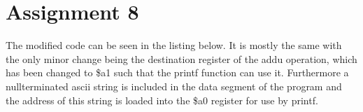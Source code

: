 \section{Assignment 8 }
The modified code can be seen in the listing below. It is mostly the same with the only minor change being the
destination register of the addu operation, which has been changed to \$a1 such that the printf function can use it.
Furthermore a nullterminated ascii string is included in the data segment of the program and the address of this string
is loaded into the \$a0 register for use by printf.

